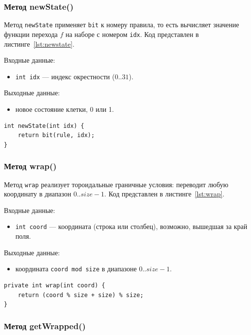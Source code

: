 \subsubsection*{Метод newState()}

Метод \texttt{newState} применяет \texttt{bit} к номеру правила, то есть вычисляет значение функции перехода $f$ на наборе с номером \texttt{idx}. Код представлен в листинге~\ref{lst:newstate}.

Входные данные:
\begin{itemize}
	\item \texttt{int idx} --- индекс окрестности ($0..31$).
\end{itemize}

Выходные данные:
\begin{itemize}
	\item новое состояние клетки, 0 или 1.
\end{itemize}

\begin{lstlisting}[caption={Метод newState()}, label={lst:newstate}]
int newState(int idx) {
	return bit(rule, idx);
}
\end{lstlisting}

\subsubsection*{Метод wrap()}

Метод \texttt{wrap} реализует тороидальные граничные условия: переводит любую координату в диапазон $0..size-1$. Код представлен в листинге~\ref{lst:wrap}.

Входные данные:
\begin{itemize}
	\item \texttt{int coord} --- координата (строка или столбец), возможно, вышедшая за край поля.
\end{itemize}

Выходные данные:
\begin{itemize}
	\item координата \texttt{coord mod size} в диапазоне $0..size-1$.
\end{itemize}

\begin{lstlisting}[caption={Метод wrap()}, label={lst:wrap}]
private int wrap(int coord) {
	return (coord % size + size) % size;
}
\end{lstlisting}

\subsubsection*{Метод getWrapped()}


